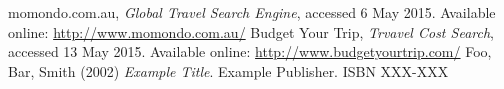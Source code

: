 \documentclass[12pt]{article}
\begin{document}
\pagebreak

\begin{thebibliography}{99}
momondo.com.au,
\emph{Global Travel Search Engine}, accessed 6 May 2015.
Available online: \url{http://www.momondo.com.au/}
Budget Your Trip,
\emph{Trvavel Cost Search}, accessed 13 May 2015.
Available online: \url{http://www.budgetyourtrip.com/}
Foo, Bar, Smith (2002)
\emph{Example Title}.
Example Publisher. ISBN XXX-XXX
\end{thebibliography}




\end{document}
